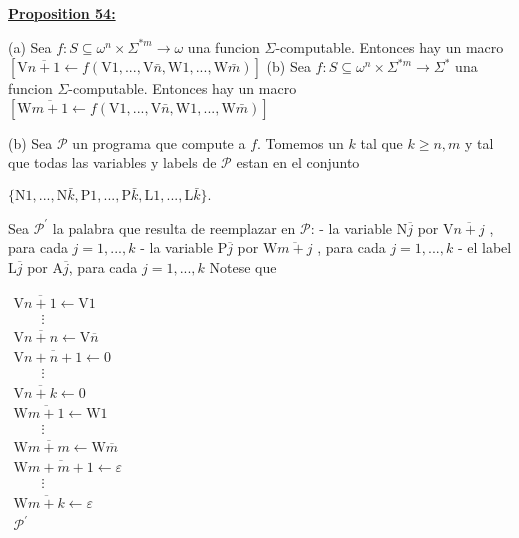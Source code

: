 \textbf{\underline{Proposition 54:}}

(a) Sea \(f:S\subseteq \omega ^{n}\times \Sigma ^{\ast m}\rightarrow \omega \) una funcion \(\Sigma \)-computable. Entonces hay un macro
\(\displaystyle \left[ \mathrm{V}\overline{n+1}\leftarrow f(\mathrm{V}1,...,\mathrm{V}\bar{n} ,\mathrm{W}1,...,\mathrm{W}\bar{m})\right] \)
(b) Sea \(f:S\subseteq \omega ^{n}\times \Sigma ^{\ast m}\rightarrow \Sigma ^{\ast }\) una funcion \(\Sigma \)-computable. Entonces hay un macro
\(\displaystyle \left[ \mathrm{W}\overline{m+1}\leftarrow f(\mathrm{V}1,...,\mathrm{V}\bar{n} ,\mathrm{W}1,...,\mathrm{W}\bar{m})\right] \)

\PROOF (b) Sea \(\mathcal{P}\) un programa que compute a \(f\). Tomemos un \(k\) tal que \( k\geq n,m\) y tal que todas las variables y labels de \(\mathcal{P}\) estan en el conjunto

\(\displaystyle \{\mathrm{N}1,...,\mathrm{N}\bar{k},\mathrm{P}1,...,\mathrm{P}\bar{k}, \mathrm{L}1,...,\mathrm{L}\bar{k}\}\text{.} \)

Sea \(\mathcal{P}^{\prime }\) la palabra que resulta de reemplazar en \( \mathcal{P}\):
- la variable \(\mathrm{N}\overline{j}\) por \(\mathrm{V}\overline{n+j}\) , para cada \(j=1,...,k\)
- la variable \(\mathrm{P}\overline{j}\) por \(\mathrm{W}\overline{m+j}\) , para cada \(j=1,...,k\)
- el label \(\mathrm{L}\overline{j}\) por \(\mathrm{A}\overline{j}\), para cada \(j=1,...,k\)
Notese que

\(\displaystyle \begin{array}{l} \mathrm{V}\overline{n+1}\leftarrow \mathrm{V}1 \\ \ \ \ \ \ \ \ \ \ \vdots \\ \mathrm{V}\overline{n+n}\leftarrow \mathrm{V}\overline{n} \\ \mathrm{V}\overline{n+n+1}\leftarrow 0 \\ \ \ \ \ \ \ \ \ \ \vdots \\ \mathrm{V}\overline{n+k}\leftarrow 0 \\ \mathrm{W}\overline{m+1}\leftarrow \mathrm{W}1 \\ \ \ \ \ \ \ \ \ \ \vdots \\ \mathrm{W}\overline{m+m}\leftarrow \mathrm{W}\overline{m} \\ \mathrm{W}\overline{m+m+1}\leftarrow \varepsilon \\ \ \ \ \ \ \ \ \ \ \vdots \\ \mathrm{W}\overline{m+k}\leftarrow \varepsilon \\ \mathcal{P}^{\prime } \end{array} \)


